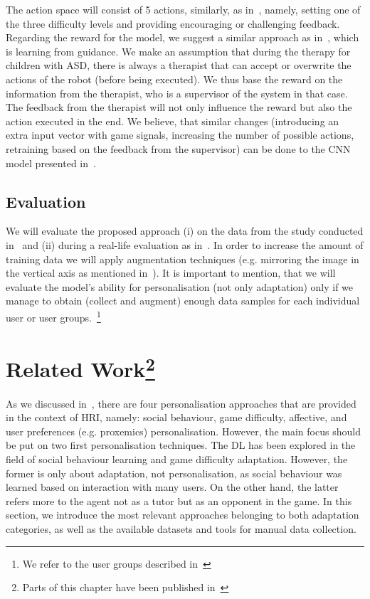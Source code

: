 \documentclass[thesis]{mas_proposal}
\begin{document}
The action space will consist of 5 actions, similarly, as in~\cite{tsiakas2018task,stolarz2022learningbased,stolarz2022personalisedrobot}, namely, setting one of the three difficulty levels and providing encouraging or challenging feedback. Regarding the reward for the model, we suggest a similar approach as in~\cite{senft2017supervised}, which is learning from guidance. We make an assumption that during the therapy for children with ASD, there is always a therapist that can accept or overwrite the actions of the robot (before being executed). We thus base the reward on the information from the therapist, who is a supervisor of the system in that case. The feedback from the therapist will not only influence the reward but also the action executed in the end. We believe, that similar changes (introducing an extra input vector with game signals, increasing the number of possible actions, retraining based on the feedback from the supervisor) can be done to the CNN model presented in~\cite{Romeo2018,Romeo2019}.

\subsection{Evaluation}
We will evaluate the proposed approach (i) on the data from the study conducted in~\cite{stolarz2022learningbased,stolarz2022personalisedrobot} and (ii) during a real-life evaluation as in~\cite{Qureshi2016,romeo2021human}. In order to increase the amount of training data we will apply augmentation techniques (e.g. mirroring the image in the vertical axis as mentioned in~\cite{romeo2021human}). It is important to mention, that we will evaluate the model's ability for personalisation (not only adaptation) only if we manage to obtain (collect and augment) enough data samples for each individual user or user groups.~\footnote{We refer to the user groups described in~\cite{stolarz2022personalisedrobot}}

\section[Related Work]{Related Work\footnote{Parts of this chapter have been published in~\cite{stolarz2022personalized}}}
\label{sec:related_work}

As we discussed in~\cite{stolarz2022personalized}, there are four personalisation approaches that are provided in the context of HRI, namely: social behaviour, game difficulty, affective, and user preferences (e.g. proxemics) personalisation. However, the main focus should be put on two first personalisation techniques. The DL has been explored in the field of social behaviour learning and game difficulty adaptation. However, the former is only about adaptation, not personalisation, as social behaviour was learned based on interaction with many users. On the other hand, the latter refers more to the agent not as a tutor but as an opponent in the game. In this section, we introduce the most relevant approaches belonging to both adaptation categories, as well as the available datasets and tools for manual data collection.
\end{document}

